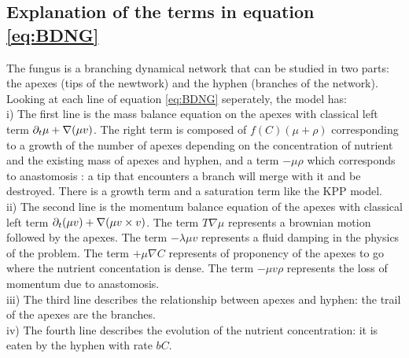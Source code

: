 \subsection{Explanation of the terms in equation \eqref{eq:BDNG}}
The fungus is a branching dynamical network that can be studied in two parts: the apexes (tips of the newtwork) and the hyphen (branches of the network).\\
Looking at each line of equation \eqref{eq:BDNG} seperately, the model has:\\
i) The first line is the mass balance equation on the apexes with classical left term $ \partial_t\mu + \nabla(\mu v)  $. The right term is composed of $f(C)(\mu + \rho)$ corresponding to a growth of the number of apexes depending on the concentration of nutrient and the existing mass of apexes and hyphen, and a term $-\mu\rho$ which corresponds to anastomosis : a tip that encounters a branch will merge with it and be destroyed. There is a growth term and a saturation term like the KPP model.
\\ ii)  The second line is the momentum balance equation of the apexes with classical left term $ \partial_t(\mu v)+\nabla(\mu v\times v) $. The term $T\nabla\mu$ represents a brownian motion followed by the apexes. The term $-\lambda\mu v$ represents a fluid damping in the physics of the problem. The term $+\mu\nabla C$ represents of proponency of the apexes to go where the nutrient concentation is dense. The term $-\mu v \rho $ represents the loss of momentum due to anastomosis.\\
iii) The third line describes the relationship between apexes and hyphen: the trail of the apexes are the branches.\\
iv) The fourth line describes the evolution of the nutrient concentration: it is eaten by the hyphen with rate $bC$. 
%